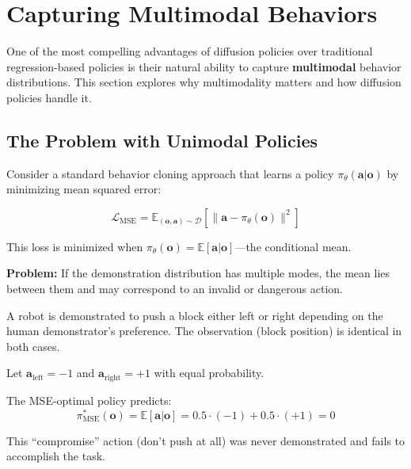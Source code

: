 \section{Capturing Multimodal Behaviors}
\label{sec:multimodal_behaviors}

One of the most compelling advantages of diffusion policies over traditional regression-based policies is their natural ability to capture \textbf{multimodal} behavior distributions. This section explores why multimodality matters and how diffusion policies handle it.

\subsection{The Problem with Unimodal Policies}
\label{subsec:unimodal_problem}

Consider a standard behavior cloning approach that learns a policy $\pi_\theta(\mathbf{a} | \mathbf{o})$ by minimizing mean squared error:

\begin{equation}
\mathcal{L}_{\text{MSE}} = \mathbb{E}_{(\mathbf{o}, \mathbf{a}) \sim \mathcal{D}}[\|\mathbf{a} - \pi_\theta(\mathbf{o})\|^2]
\label{eq:mse_loss}
\end{equation}

This loss is minimized when $\pi_\theta(\mathbf{o}) = \mathbb{E}[\mathbf{a} | \mathbf{o}]$---the conditional mean.

\textbf{Problem:} If the demonstration distribution has multiple modes, the mean lies between them and may correspond to an invalid or dangerous action.

\begin{example}
A robot is demonstrated to push a block either left or right depending on the human demonstrator's preference. The observation (block position) is identical in both cases.

Let $\mathbf{a}_{\text{left}} = -1$ and $\mathbf{a}_{\text{right}} = +1$ with equal probability.

The MSE-optimal policy predicts:
\begin{equation}
\pi^*_{\text{MSE}}(\mathbf{o}) = \mathbb{E}[\mathbf{a} | \mathbf{o}] = 0.5 \cdot (-1) + 0.5 \cdot (+1) = 0
\end{equation}

This ``compromise'' action (don't push at all) was never demonstrated and fails to accomplish the task.
\end{example}

